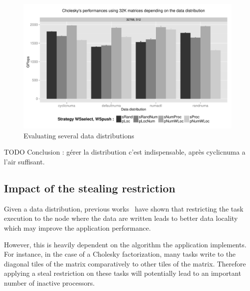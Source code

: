 \documentclass{Styles/llncs}
\begin{document}
\begin{figure}[t]
  \centering
  \includegraphics[scale=0.5]{figures/graph_distrib.pdf}
\caption{Evaluating several data distributions}
\label{fig:eval-distrib}
\end{figure}


TODO Conclusion : gérer la distribution c'est indispensable, après cyclicnuma a l'air suffisant.


\subsection{Impact of the stealing restriction}

Given a data distribution, previous works~\cite{Olivier:2012:CMW:2388996.2389085}
have shown that restricting the task execution to the node where the data are
written leads to better data locality which may improve the application performance.

However, this is heavily dependent on the algorithm the application implements. For instance, in the case
of a Cholesky factorization, many tasks write to the diagonal tiles
of the matrix comparatively to other tiles of the matrix. Therefore applying
a steal restriction on these tasks will potentially lead to an important number
of inactive processors.
\end{document}
